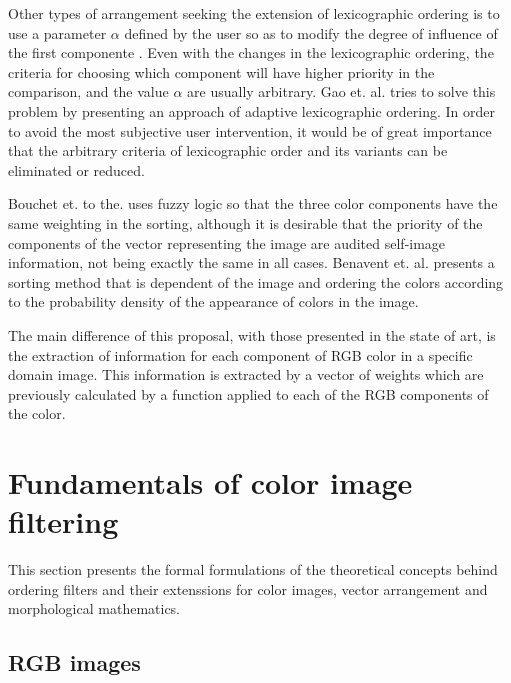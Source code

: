 Other types of arrangement seeking the extension of lexicographic ordering is to use a parameter $\alpha$  defined by the user so as to modify the degree of influence of the first componente \cite{ortiz2002procesamiento,angulo2005unified}. Even with the changes in the lexicographic ordering, the criteria for choosing which component will have higher priority in the comparison, and the value $\alpha$ are usually arbitrary. Gao et. al. \cite{gao2013adaptive} tries to solve this problem by presenting an approach of adaptive lexicographic ordering. 
In order to avoid the most subjective user intervention, it would be of great importance that the arbitrary criteria of lexicographic order and its variants can be eliminated or reduced.


Bouchet et. to the. \cite{bouchet2016fuzzy} uses fuzzy logic so that the three color components have the same weighting in the sorting, although it is desirable that the priority of the components of the vector representing the image are audited self-image information, not being exactly the same in all cases. Benavent et. al. \cite{benavent2012mathematical} presents a sorting method that is dependent of the image and ordering the colors according to the probability density of the appearance of colors in the image.

The main difference of this proposal, with those presented in the state of art, is the extraction of information for each component of RGB color in a specific domain image. This information is extracted by a vector of weights which are previously calculated by a function applied to each of the RGB components of the color.



\section{Fundamentals of color image filtering}
\label{Teo}

This section presents the formal formulations of the theoretical concepts behind ordering filters and their extenssions for color images, vector arrangement and morphological mathematics.

\subsection{RGB images}


